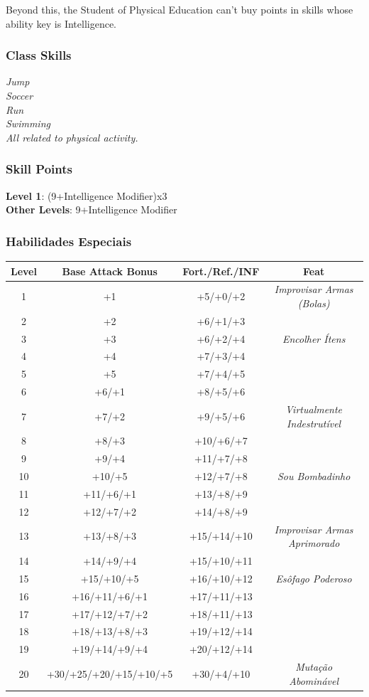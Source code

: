 \documentclass[ letterpaper,12pt]{article}
\begin{document}
Beyond this, the Student of Physical Education can't buy points in skills whose ability key is Intelligence.\\

\subsubsection{Class Skills}
{\it Jump\\
Soccer\\
Run\\
Swimming\\
All related to physical activity.}

\subsubsection{Skill Points}
{\bf Level 1}: (9+Intelligence Modifier)x3\\
{\bf Other Levels}: 9+Intelligence Modifier\\

\subsubsection{Habilidades Especiais}

\begin{center} \begin{tabular}{|c||c|c|c|}
\hline
{\bf Level}&{\bf Base Attack Bonus}&{\bf Fort./Ref./INF}&{\bf Feat}\\
\hline
1&+1&+5/+0/+2&{\it Improvisar Armas (Bolas)}\\
\hline
2&+2&+6/+1/+3&\\
\hline
3&+3&+6/+2/+4&{\it Encolher Ítens}\\
\hline
4&+4&+7/+3/+4&\\
\hline
5&+5&+7/+4/+5&\\
\hline
6&+6/+1&+8/+5/+6&\\
\hline
7&+7/+2&+9/+5/+6&{\it Virtualmente Indestrutível}\\
\hline
8&+8/+3&+10/+6/+7&\\
\hline
9&+9/+4&+11/+7/+8&\\
\hline
10&+10/+5&+12/+7/+8&{\it Sou Bombadinho}\\
\hline
11&+11/+6/+1&+13/+8/+9&\\
\hline
12&+12/+7/+2&+14/+8/+9&\\
\hline
13&+13/+8/+3&+15/+14/+10&{\it Improvisar Armas Aprimorado}\\
\hline
14&+14/+9/+4&+15/+10/+11&\\
\hline
15&+15/+10/+5&+16/+10/+12&{\it Esôfago Poderoso}\\
\hline
16&+16/+11/+6/+1&+17/+11/+13&\\
\hline
17&+17/+12/+7/+2&+18/+11/+13&\\
\hline
18&+18/+13/+8/+3&+19/+12/+14&\\
\hline
19&+19/+14/+9/+4&+20/+12/+14&\\
\hline
20&+30/+25/+20/+15/+10/+5&+30/+4/+10&{\it Mutação Abominável}\\
\hline
\end{tabular} \end{center}
\end{document}
